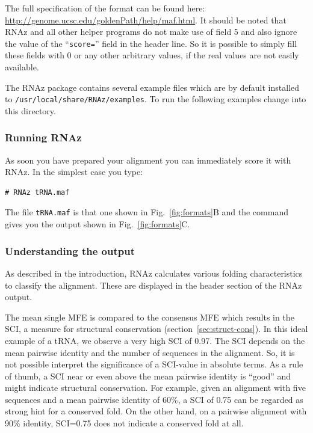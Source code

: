\documentclass[11pt]{article}
\begin{document}
The full specification of the format can be found here:
\url{http://genome.ucsc.edu/goldenPath/help/maf.html}. It should be noted
that RNAz and all other helper programs do not make use of field 5 and also
ignore the value of the ``\texttt{score=}'' field in the header line. So it
is possible to simply fill these fields with 0 or any other arbitrary
values, if the real values are not easily available.

The RNAz package contains several example files which are by
default installed to \texttt{/usr/local/share/RNAz/examples}. To run the
following examples change into this directory.

\subsubsection{Running RNAz}

As soon you have prepared your alignment you can immediately score it with
RNAz. In the simplest case you type:

\begin{verbatim}
# RNAz tRNA.maf
\end{verbatim}

The file \texttt{tRNA.maf} is that one shown in Fig.~\ref{fig:formats}B and
the command gives you the output shown in Fig.~\ref{fig:formats}C.

\subsubsection{Understanding the output}
\label{sec:understanding-output}

As described in the introduction, RNAz calculates various folding
characteristics to classify the alignment. These are displayed in the
header section of the RNAz output.

The mean single MFE is compared to the consensus MFE which results in the
SCI, a measure for structural conservation (section~\ref{sec:struct-cons}).
In this ideal example of a tRNA, we observe a very high SCI of 0.97. The
SCI depends on the mean pairwise identity and the number of sequences in
the alignment.  So, it is not possible interpret the significance of a
SCI-value in absolute terms.  As a rule of thumb, a SCI near or even above
the mean pairwise identity is ``good'' and might indicate structural
conservation.  For example, given an alignment with five sequences and a
mean pairwise identity of 60\%, a SCI of 0.75 can be regarded as strong
hint for a conserved fold. On the other hand, on a pairwise alignment with
90\% identity, SCI=0.75 does not indicate a conserved fold at all.
\end{document}
